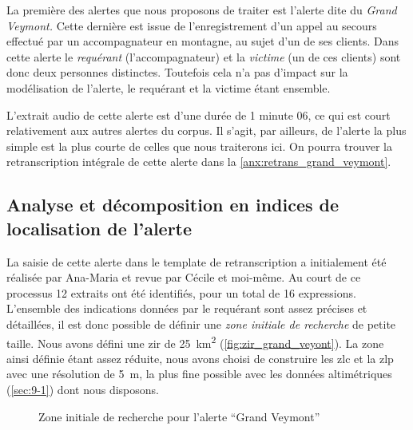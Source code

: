 La première des alertes que nous proposons de traiter est l'alerte
dite du \emph{Grand Veymont.} Cette dernière est issue de
l'enregistrement d'un appel au secours effectué par un accompagnateur
en montagne, au sujet d'un de ses clients. Dans cette alerte le
\emph{requérant} (\ie l'accompagnateur) et la \emph{victime} (\ie un
de ces clients) sont donc deux personnes distinctes. Toutefois cela
n'a pas d'impact sur la modélisation de l'alerte, le requérant et la
victime étant ensemble.

L'extrait audio de cette alerte est d'une durée de 1 minute 06, ce qui
est court relativement aux autres alertes du corpus. Il s'agit, par
ailleurs, de l'alerte la plus simple est la plus courte de celles que
nous traiterons ici. On pourra trouver la retranscription intégrale de
cette alerte dans la \autoref{anx:retrans_grand_veymont}.

\subsection{Analyse et décomposition en indices de localisation de
  l'alerte}
\label{subsec:9-2-1}

La saisie de cette alerte dans le template de retranscription a
initialement été réalisée par Ana-Maria  et revue
par Cécile  et moi-même. Au court de ce processus 12
extraits ont été identifiés, pour un total de 16
expressions. L'ensemble des indications données par le requérant sont
assez précises et détaillées, il est donc possible de définir une
\emph{zone initiale de recherche} de petite taille. Nous avons défini
une \ac{zir} de \SI{25}{\kilo\meter\squared}
(\autoref{fig:zir_grand_veyont}). La zone ainsi définie étant assez
réduite, nous avons choisi de construire les \ac{zlc} et la \ac{zlp}
avec une résolution de \SI{5}{\meter}, la plus fine possible avec les
données altimétriques (\autoref{sec:9-1}) dont nous disposons.

\begin{figure}
  \centering
  
  \caption{Zone initiale de recherche pour l'alerte \enquote{Grand
      Veymont}}
  \label{fig:zir_grand_veyont}
\end{figure}

